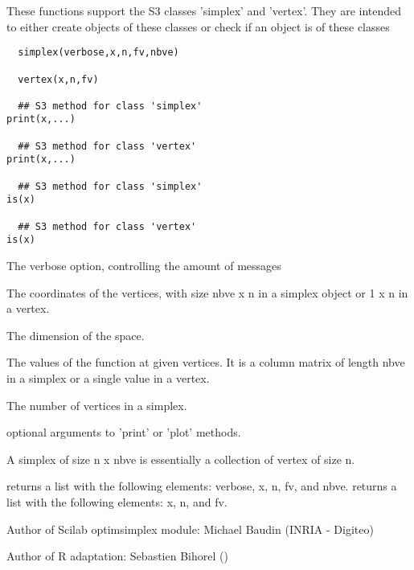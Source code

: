 %
\begin{Description}\relax
These functions support the S3 classes 'simplex' and 'vertex'. They are 
intended to either create objects of these classes or check if an object is 
of these classes
\end{Description}
%
\begin{Usage}
\begin{verbatim}
  simplex(verbose,x,n,fv,nbve)
  
  vertex(x,n,fv)
  
  ## S3 method for class 'simplex'
print(x,...)
  
  ## S3 method for class 'vertex'
print(x,...)
  
  ## S3 method for class 'simplex'
is(x)
  
  ## S3 method for class 'vertex'
is(x)
\end{verbatim}
\end{Usage}
%
\begin{Arguments}
\begin{ldescription}
\item[\code{verbose}] The verbose option, controlling the amount of messages
\item[\code{x}] The coordinates of the vertices, with size nbve x n in a simplex 
object or 1 x n in a vertex.
\item[\code{n}] The dimension of the space.
\item[\code{fv}] The values of the function at given vertices. It is a column
matrix of length nbve in a simplex or a single value in a vertex.
\item[\code{nbve}] The number of vertices in a simplex.
\item[\code{...}] optional arguments to 'print' or 'plot' methods.
\end{ldescription}
\end{Arguments}
%
\begin{Details}\relax
A simplex of size n x nbve is essentially a collection of vertex of size n. 
\end{Details}
%
\begin{Value}
 returns a list with the following elements: verbose, x, n, fv, 
and nbve.
 returns a list with the following elements: x, n, and fv.
\end{Value}
%
\begin{Author}\relax
Author of Scilab optimsimplex module: Michael Baudin (INRIA - Digiteo)

Author of R adaptation: Sebastien Bihorel ()
\end{Author}
